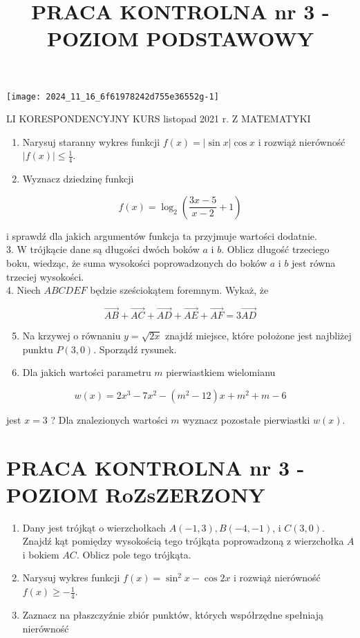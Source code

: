 \documentclass[10pt]{article}
\title{PRACA KONTROLNA nr 3 - POZIOM PODSTAWOWY }
\author{}
\date{}
\begin{document}
\maketitle
\begin{center}
\texttt{[image: 2024\_11\_16\_6f61978242d755e36552g-1]}
\end{center}

LI KORESPONDENCYJNY KURS listopad 2021 r. Z MATEMATYKI

\begin{enumerate}
  \item Narysuj staranny wykres funkcji $f(x)=|\sin x| \cos x$ i rozwiąż nierówność $|f(x)| \leqslant \frac{1}{4}$.
  \item Wyznacz dziedzinę funkcji
\end{enumerate}

$$
f(x)=\log _{2}\left(\frac{3 x-5}{x-2}+1\right)
$$

i sprawdź dla jakich argumentów funkcja ta przyjmuje wartości dodatnie.\\
3. W trójkącie dane są długości dwóch boków $a$ i $b$. Oblicz długość trzeciego boku, wiedząc, że suma wysokości poprowadzonych do boków $a$ i $b$ jest równa trzeciej wysokości.\\
4. Niech $A B C D E F$ będzie sześciokątem foremnym. Wykaż, że

$$
\overrightarrow{A B}+\overrightarrow{A C}+\overrightarrow{A D}+\overrightarrow{A E}+\overrightarrow{A F}=3 \overrightarrow{A D}
$$

\begin{enumerate}
  \setcounter{enumi}{4}
  \item Na krzywej o równaniu $y=\sqrt{2 x}$ znajdź miejsce, które położone jest najbliżej punktu $P(3,0)$. Sporządź rysunek.
  \item Dla jakich wartości parametru $m$ pierwiastkiem wielomianu
\end{enumerate}

$$
w(x)=2 x^{3}-7 x^{2}-\left(m^{2}-12\right) x+m^{2}+m-6
$$

jest $x=3$ ? Dla znalezionych wartości $m$ wyznacz pozostałe pierwiastki $w(x)$.

\section*{PRACA KONTROLNA nr 3 - POZIOM RoZsZERZONY}
\begin{enumerate}
  \item Dany jest trójkąt o wierzchołkach $A(-1,3), B(-4,-1)$, i $C(3,0)$. Znajdź kąt pomiędzy wysokością tego trójkąta poprowadzoną z wierzchołka $A$ i bokiem $A C$. Oblicz pole tego trójkąta.
  \item Narysuj wykres funkcji $f(x)=\sin ^{2} x-\cos 2 x$ i rozwiąż nierówność $f(x) \geqslant-\frac{1}{4}$.
  \item Zaznacz na płaszczyźnie zbiór punktów, których współrzędne spełniają nierówność
\end{enumerate}
\end{document}
